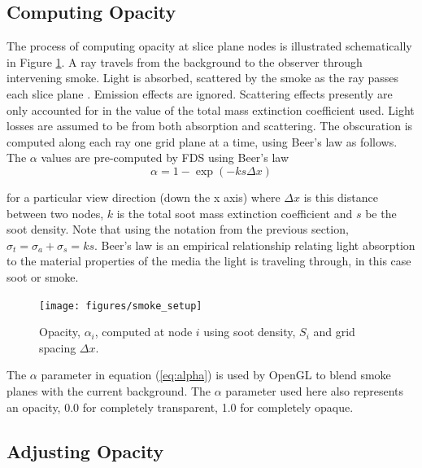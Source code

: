 %
%

\subsection{Computing Opacity}
The process of computing opacity at slice plane nodes is illustrated schematically in Figure \ref{figsmokesetup}. A ray travels from the background to the observer through intervening
smoke. Light is absorbed, scattered by the smoke as the ray passes each slice plane .  Emission effects are ignored. Scattering effects presently are only accounted for in the value of the total mass extinction coefficient used.  Light losses are assumed to be from both absorption and scattering. The obscuration is computed along each ray one grid plane at a time, using Beer's law as follows.  The $\alpha$ values are pre-computed by FDS using Beer's law~\cite{Siegel:2001}
\begin{equation}
\alpha=1-\exp(-ks\Delta x) \label{eq:alpha}
\end{equation}

\noindent for a particular view direction (down the x axis) where $\Delta x$ is this distance between two nodes, $k$ is the total soot mass extinction coefficient and $s$ be the soot density.  Note that using the notation from the previous section, $\sigma_t=\sigma_a+\sigma_s=ks$.  Beer's law is an empirical relationship relating light absorption to the material properties of the media the light is traveling through, in this case soot or smoke.

\begin{figure}[\figoptions]
\begin{center}
\texttt{[image: figures/smoke\_setup]}
\end{center}
\caption {Opacity, $\alpha_i$, computed at node $i$ using soot density, $S_i$ and grid spacing $\Delta x$.}
\label{figsmokesetup}
\end{figure}


The $\alpha$ parameter in equation (\ref{eq:alpha}) is used by OpenGL to blend smoke planes with the current background.  The $\alpha$ parameter used here also represents an opacity, 0.0 for completely transparent, 1.0 for completely opaque.

%
%

\subsection{Adjusting Opacity}

